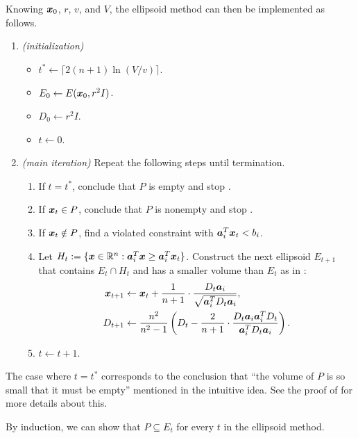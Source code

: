 \begin{enumerate}
Knowing \(\bm{x}_0\), \(r\), \(v\), and \(V\), the ellipsoid method can then
be implemented as follows.
\begin{enumerate}[label={(\arabic*)}]
\item \emph{(initialization)}
\begin{itemize}
\item \(t^{*}\leftarrow\lceil 2(n+1)\ln(V/v)\rceil\).
\item \(E_0\leftarrow E(\bm{x}_0,r^{2}I)\).
\item \(D_0\leftarrow r^{2}I\).
\item \(t\leftarrow 0\).
\end{itemize}
\item \emph{(main iteration)} Repeat the following steps until termination.
\begin{enumerate}
\item If \(t=t^{*}\), conclude that \(P\) is empty and stop .
\item If \(\bm{x}_t\in P\), conclude that \(P\) is nonempty and stop
.
\item If \(\bm{x}_t\notin P\), find a violated constraint with
\(\bm{a}_i^{T}\bm{x}_t<b_i\).
\item Let
\(H_t:=\{\bm{x}\in\mathbb{R}^n:\bm{a}_i^{T}\bm{x}\ge\bm{a}_i^{T}\bm{x}_t\}\).
Construct the next ellipsoid \(E_{t+1}\) that contains \(E_t\cap H_t\) and has
a smaller volume than \(E_t\) as in :
\begin{align*}
\bm{x}_{t+1}&\leftarrow\bm{x}_{t}+\frac{1}{n+1}
\cdot \frac{D_t\bm{a}_i}{\sqrt{\bm{a}_i^{T}D_t\bm{a}_i}}, \\
D_{t+1}&\leftarrow\frac{n^{2}}{n^{2}-1}\left(D_t-\frac{2}{n+1}\cdot 
\frac{D_t\bm{a}_i\bm{a}_i^{T}D_t}{\bm{a}_i^{T}D_t\bm{a}_i}\right).
\end{align*}
\item \(t\leftarrow t+1\).
\end{enumerate}
\end{enumerate}
\begin{remark}
\item The case where \(t=t^{*}\) corresponds to the conclusion that ``the volume of
\(P\) is so small that it must be empty'' mentioned in the intuitive idea.  See
the proof of  for more details about this.
\item By induction, we can show that \(P\subseteq E_t\) for every \(t\) in the
ellipsoid method.


\end{remark}
\end{enumerate}
